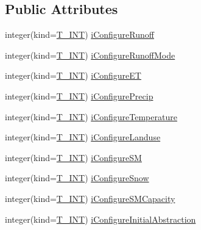 \subsection*{Public Attributes}
\begin{DoxyCompactItemize}
\item 
integer(kind=\hyperlink{namespacetest_a6f91ebd89b58cfcc5da99faed9385c1e}{T\_\-INT}) \hyperlink{typetest_1_1_t___m_o_d_e_l___c_o_n_f_i_g_u_r_a_t_i_o_n_a28c276674b3f423d51e2302ca0584bcf}{iConfigureRunoff}
\item 
integer(kind=\hyperlink{namespacetest_a6f91ebd89b58cfcc5da99faed9385c1e}{T\_\-INT}) \hyperlink{typetest_1_1_t___m_o_d_e_l___c_o_n_f_i_g_u_r_a_t_i_o_n_a25f9220d83a270f10efc168407454469}{iConfigureRunoffMode}
\item 
integer(kind=\hyperlink{namespacetest_a6f91ebd89b58cfcc5da99faed9385c1e}{T\_\-INT}) \hyperlink{typetest_1_1_t___m_o_d_e_l___c_o_n_f_i_g_u_r_a_t_i_o_n_a7a892e494280b3d90bbb4d79e4cb28ec}{iConfigureET}
\item 
integer(kind=\hyperlink{namespacetest_a6f91ebd89b58cfcc5da99faed9385c1e}{T\_\-INT}) \hyperlink{typetest_1_1_t___m_o_d_e_l___c_o_n_f_i_g_u_r_a_t_i_o_n_a311b249c880ae79d9d919c4c8d6cc2c4}{iConfigurePrecip}
\item 
integer(kind=\hyperlink{namespacetest_a6f91ebd89b58cfcc5da99faed9385c1e}{T\_\-INT}) \hyperlink{typetest_1_1_t___m_o_d_e_l___c_o_n_f_i_g_u_r_a_t_i_o_n_ae5530d148a3320fb1ae12169468bea41}{iConfigureTemperature}
\item 
integer(kind=\hyperlink{namespacetest_a6f91ebd89b58cfcc5da99faed9385c1e}{T\_\-INT}) \hyperlink{typetest_1_1_t___m_o_d_e_l___c_o_n_f_i_g_u_r_a_t_i_o_n_a52f14853971b661ad49e682e51bfa66c}{iConfigureLanduse}
\item 
integer(kind=\hyperlink{namespacetest_a6f91ebd89b58cfcc5da99faed9385c1e}{T\_\-INT}) \hyperlink{typetest_1_1_t___m_o_d_e_l___c_o_n_f_i_g_u_r_a_t_i_o_n_a3c5d8e90f7756f1aa83eecb2cf90ddb3}{iConfigureSM}
\item 
integer(kind=\hyperlink{namespacetest_a6f91ebd89b58cfcc5da99faed9385c1e}{T\_\-INT}) \hyperlink{typetest_1_1_t___m_o_d_e_l___c_o_n_f_i_g_u_r_a_t_i_o_n_aa237147ae250074f6cde1fb1b4d447d4}{iConfigureSnow}
\item 
integer(kind=\hyperlink{namespacetest_a6f91ebd89b58cfcc5da99faed9385c1e}{T\_\-INT}) \hyperlink{typetest_1_1_t___m_o_d_e_l___c_o_n_f_i_g_u_r_a_t_i_o_n_ae57037c8b2a22062deea5c5c963fabca}{iConfigureSMCapacity}
\item 
integer(kind=\hyperlink{namespacetest_a6f91ebd89b58cfcc5da99faed9385c1e}{T\_\-INT}) \hyperlink{typetest_1_1_t___m_o_d_e_l___c_o_n_f_i_g_u_r_a_t_i_o_n_a8b8c3341923c6ee77cc8ae4ef6222bf2}{iConfigureInitialAbstraction}

\end{DoxyCompactItemize}
